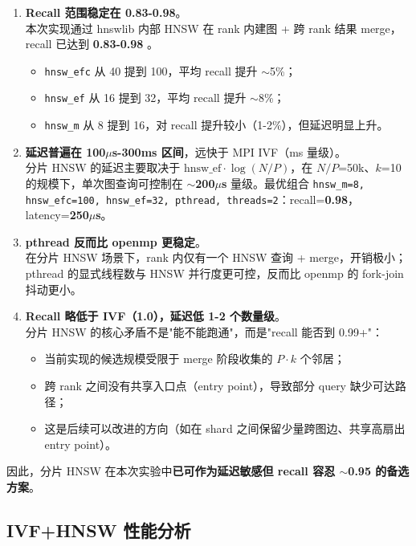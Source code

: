 \documentclass[a4paper]{article}
\begin{document}
\begin{enumerate}
    \item \textbf{Recall 范围稳定在 0.83-0.98}。\\
    本次实现通过 hnswlib 内部 HNSW 在 rank 内建图 + 跨 rank 结果 merge，recall 已达到 \textbf{0.83-0.98} 。
    \begin{itemize}
        \item \texttt{hnsw\_efc} 从 40 提到 100，平均 recall 提升 $\sim$5\%；
        \item \texttt{hnsw\_ef} 从 16 提到 32，平均 recall 提升 $\sim$8\%；
        \item \texttt{hnsw\_m} 从 8 提到 16，对 recall 提升较小（1-2\%），但延迟明显上升。
    \end{itemize}

    \item \textbf{延迟普遍在 100$\mu$s-300ms 区间}，远快于 MPI IVF（ms 量级）。\\
    分片 HNSW 的延迟主要取决于 $\text{hnsw\_ef} \cdot \log(N/P)$，在 $N/P$=50k、$k$=10 的规模下，单次图查询可控制在 $\sim$\textbf{200$\mu$s} 量级。最优组合 \texttt{hnsw\_m=8, hnsw\_efc=100, hnsw\_ef=32, pthread, threads=2}：recall=\textbf{0.98}，latency=\textbf{250$\mu$s}。

    \item \textbf{pthread 反而比 openmp 更稳定}。\\
    在分片 HNSW 场景下，rank 内仅有一个 HNSW 查询 + merge，开销极小；pthread 的显式线程数与 HNSW 并行度更可控，反而比 openmp 的 fork-join 抖动更小。

    \item \textbf{Recall 略低于 IVF（1.0），延迟低 1-2 个数量级}。\\
    分片 HNSW 的核心矛盾不是"能不能跑通"，而是"recall 能否到 0.99+"：
    \begin{itemize}
        \item 当前实现的候选规模受限于 merge 阶段收集的 $P \cdot k$ 个邻居；
        \item 跨 rank 之间没有共享入口点（entry point），导致部分 query 缺少可达路径；
        \item 这是后续可以改进的方向（如在 shard 之间保留少量跨图边、共享高扇出 entry point）。
    \end{itemize}
\end{enumerate}

因此，分片 HNSW 在本次实验中\textbf{已可作为延迟敏感但 recall 容忍 $\sim$0.95 的备选方案}。

\subsection{IVF+HNSW 性能分析}
\end{document}
